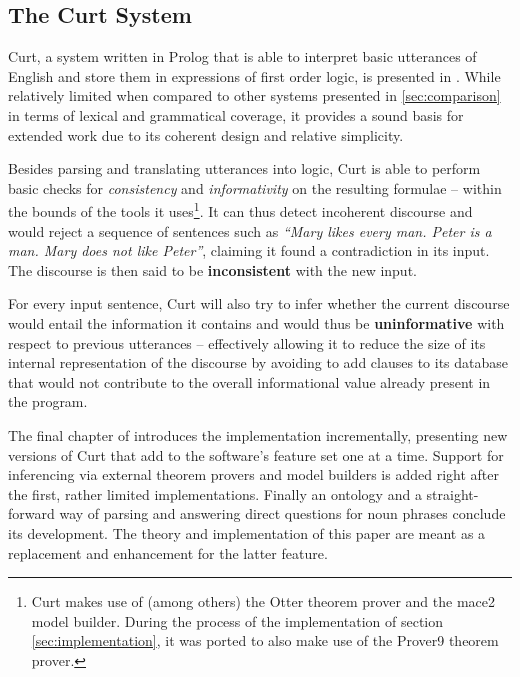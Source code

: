 \documentclass[a4paper]{article}
\newcommand{\term}[1]{\textsf{\textbf{#1}}} %
\newcommand{\pn}{\textsf} %
\newcommand{\curt}{\pn{Curt}}
\newcommand{\prol}{\pn{Prolog}}
\theoremstyle{remark}
\theoremstyle{remark}
\theoremstyle{definition}
\theoremstyle{definition}
\begin{document}
\subsection{The Curt System} \label{sec:curt}

\curt, a system written in \prol{} that is able to interpret basic utterances
of English and store them in expressions of first order logic, is
presented in \cite[chapter 6]{blackburnbos:cl1}. While relatively limited when
compared to other systems presented in \ref{sec:comparison} in terms of lexical
and grammatical coverage, it provides a sound basis for extended work due to
its coherent design and relative simplicity.

Besides parsing and translating utterances into logic, \curt{} is able to perform
basic checks for \emph{consistency} and \emph{informativity} on the resulting
formulae -- within the bounds of the tools it uses\footnote{\curt{} makes use
of (among others) the \pn{Otter} theorem prover and the \pn{mace2} model
builder. During the process of the implementation of section
\ref{sec:implementation}, it was ported to also make use of the \pn{Prover9}
theorem prover.}.
It can thus detect incoherent discourse and would reject a sequence of
sentences such as \emph{``Mary likes every man. Peter is a man. Mary does not
like Peter''}, claiming it found a contradiction in its input. The discourse is
then said to be \term{inconsistent} with the new input.

For every input
sentence, \curt{} will also try to infer whether the current discourse would
entail the information it contains and would thus be \term{uninformative} with
respect to previous utterances – effectively allowing it to
reduce the size of its internal representation of the discourse by avoiding to
add clauses to its database that would not contribute to the overall informational value
already present in the program.

The final chapter of \cite{blackburnbos:cl1} introduces the implementation
incrementally, presenting new versions of \curt{} that add to the software's
feature set one at a time. Support for inferencing via external theorem provers
and model builders is added right after the first, rather limited implementations.
Finally an ontology and a straight-forward way of parsing and answering direct
questions for noun phrases conclude its development. The theory and
implementation of this paper are meant as a replacement and enhancement for the
latter feature. 
\end{document}

